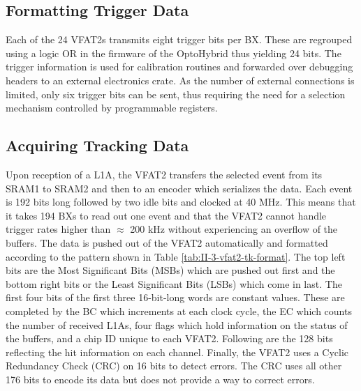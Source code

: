     \subsection{Formatting Trigger Data}

      Each of the 24 VFAT2s transmits eight trigger bits per BX. These are regrouped using a logic OR in the firmware of the OptoHybrid thus yielding 24 bits. The trigger information is used for calibration routines and forwarded over debugging headers to an external electronics crate. As the number of external connections is limited, only six trigger bits can be sent, thus requiring the need for a selection mechanism controlled by programmable registers.

    \subsection{Acquiring Tracking Data}

      Upon reception of a L1A, the VFAT2 transfers the selected event from its SRAM1 to SRAM2 and then to an encoder which serializes the data. Each event is 192 bits long followed by two idle bits and clocked at 40 MHz. This means that it takes 194 BXs to read out one event and that the VFAT2 cannot handle trigger rates higher than $\approx$ 200 kHz without experiencing an overflow of the buffers. The data is pushed out of the VFAT2 automatically and formatted according to the pattern shown in Table \ref{tab:II-3-vfat2-tk-format}. The top left bits are the Most Significant Bits (MSBs) which are pushed out first and the bottom right bits or the Least Significant Bits (LSBs) which come in last. The first four bits of the first three 16-bit-long words are constant values. These are completed by the BC which increments at each clock cycle, the EC which counts the number of received L1As, four flags which hold information on the status of the buffers, and a chip ID unique to each VFAT2. Following are the 128 bits reflecting the hit information on each channel. Finally, the VFAT2 uses a Cyclic Redundancy Check (CRC) on 16 bits to detect errors. The CRC uses all other 176 bits to encode its data but does not provide a way to correct errors. \\

